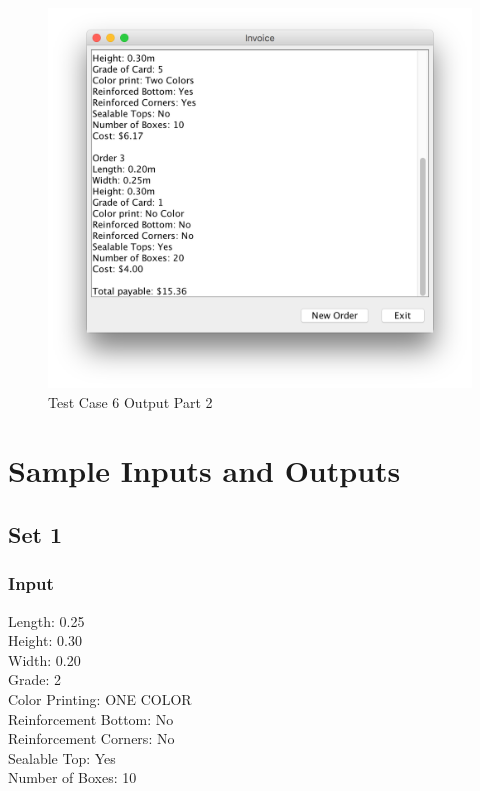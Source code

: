 \documentclass[12pt]{article}
\begin{document}
\begin{figure}[H]
	\includegraphics[width=\linewidth]{./screenshots/test_case_6_output_part2.png}
	\caption{Test Case 6 Output Part 2}
	\label{test_case_6_output}
\end{figure}
\newpage
\clearpage
\section{Sample Inputs and Outputs}
\subsection{Set 1}
\subsubsection{Input}
Length: 0.25\\
Height: 0.30\\
Width: 0.20\\
Grade: 2\\
Color Printing: ONE COLOR\\
Reinforcement Bottom: No\\
Reinforcement Corners: No\\
Sealable Top: Yes\\
Number of Boxes: 10\\
\end{document}
